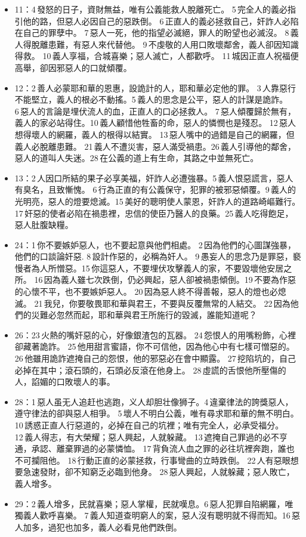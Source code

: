 \begin{itemize}
\item 11：4 發怒的日子，資財無益，唯有公義能救人脫離死亡。 5 完全人的義必指引他的路，但惡人必因自己的惡跌倒。 6 正直人的義必拯救自己，奸詐人必陷在自己的罪孽中。 7 惡人一死，他的指望必滅絕，罪人的盼望也必滅沒。 8 義人得脫離患難，有惡人來代替他。 9 不虔敬的人用口敗壞鄰舍，義人卻因知識得救。 10 義人享福，合城喜樂；惡人滅亡，人都歡呼。 11 城因正直人祝福便高舉，卻因邪惡人的口就傾覆。
\item 12：2 善人必蒙耶和華的恩惠，設詭計的人，耶和華必定他的罪。 3 人靠惡行不能堅立，義人的根必不動搖。5 義人的思念是公平，惡人的計謀是詭詐。 6 惡人的言論是埋伏流人的血，正直人的口必拯救人。 7 惡人傾覆歸於無有，義人的家必站得住。10 義人顧惜他牲畜的命，惡人的憐憫也是殘忍。 12 惡人想得壞人的網羅，義人的根得以結實。 13 惡人嘴中的過錯是自己的網羅，但義人必脫離患難。 21 義人不遭災害，惡人滿受禍患。26 義人引導他的鄰舍，惡人的道叫人失迷。28 在公義的道上有生命，其路之中並無死亡。
\item 13：2 人因口所結的果子必享美福，奸詐人必遭強暴。5 義人恨惡謊言，惡人有臭名，且致慚愧。 6 行為正直的有公義保守，犯罪的被邪惡傾覆。9 義人的光明亮，惡人的燈要熄滅。15 美好的聰明使人蒙恩，奸詐人的道路崎嶇難行。17 奸惡的使者必陷在禍患裡，忠信的使臣乃醫人的良藥。25 義人吃得飽足，惡人肚腹缺糧。
\item 24：1 你不要嫉妒惡人，也不要起意與他們相處。 2 因為他們的心圖謀強暴，他們的口談論奸惡.  8 設計作惡的，必稱為奸人。 9 愚妄人的思念乃是罪惡，褻慢者為人所憎惡。15 你這惡人，不要埋伏攻擊義人的家，不要毀壞他安居之所。 16 因為義人雖七次跌倒，仍必興起，惡人卻被禍患傾倒。19 不要為作惡的心懷不平，也不要嫉妒惡人。 20 因為惡人終不得善報，惡人的燈也必熄滅。 21 我兒，你要敬畏耶和華與君王，不要與反覆無常的人結交。 22 因為他們的災難必忽然而起，耶和華與君王所施行的毀滅，誰能知道呢？
\item 26：23 火熱的嘴奸惡的心，好像銀渣包的瓦器。 24 怨恨人的用嘴粉飾，心裡卻藏著詭詐。 25 他用甜言蜜語，你不可信他，因為他心中有七樣可憎惡的。 26 他雖用詭詐遮掩自己的怨恨，他的邪惡必在會中顯露。 27 挖陷坑的，自己必掉在其中；滾石頭的，石頭必反滾在他身上。 28 虛謊的舌恨他所壓傷的人，諂媚的口敗壞人的事。
\item 28：1 惡人虽无人追赶也逃跑，义人却胆壮像狮子。4 違棄律法的誇獎惡人，遵守律法的卻與惡人相爭。 5 壞人不明白公義，唯有尋求耶和華的無不明白。 10 誘惑正直人行惡道的，必掉在自己的坑裡；唯有完全人，必承受福分。 12 義人得志，有大榮耀；惡人興起，人就躲藏。 13 遮掩自己罪過的必不亨通，承認、離棄罪過的必蒙憐恤。 17 背負流人血之罪的必往坑裡奔跑，誰也不可攔阻他。 18 行動正直的必蒙拯救，行事彎曲的立時跌倒。 22 人有惡眼想要急速發財，卻不知窮乏必臨到他身。 28 惡人興起，人就躲藏；惡人敗亡，義人增多。
\item 29：2 義人增多，民就喜樂；惡人掌權，民就嘆息。6 惡人犯罪自陷網羅，唯獨義人歡呼喜樂。 7 義人知道查明窮人的案，惡人沒有聰明就不得而知。16 惡人加多，過犯也加多，義人必看見他們跌倒。
\end{itemize}

